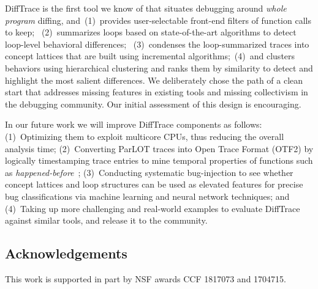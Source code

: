 DiffTrace is the first tool we know of that situates debugging around {\em whole program}
diffing, and~(1)~provides user-selectable front-end filters of function calls to keep;
~(2)~summarizes loops based on state-of-the-art algorithms to detect loop-level
behavioral differences;
~(3)~condenses the loop-summarized
traces into concept lattices that are built using incremental
algorithms;~(4)~and clusters behaviors using hierarchical clustering and ranks them by similarity to detect and highlight the most salient differences.
We deliberately chose the path of a clean start that addresses missing features
in existing tools and missing collectivism in the debugging community.
%
Our initial assessment of this design is encouraging.
%

In our future work we will improve DiffTrace components as follows:
%
%
(1)~Optimizing them to exploit multicore CPUs, thus reducing the overall analysis time;
%
(2)~Converting ParLOT traces into Open Trace Format (OTF2) by logically timestamping trace entries to mine temporal properties of functions such as \textit{happened-before}~\cite{lamport};
%
(3)~Conducting systematic bug-injection to see whether concept lattices and loop structures can be used as elevated features for precise bug classifications via machine learning and neural network techniques; and
%
(4)~Taking up more challenging and real-world examples to evaluate DiffTrace against similar tools, and release it to the community.

\subsection{Acknowledgements} This work is supported in part by
NSF awards CCF 1817073 and 1704715.
